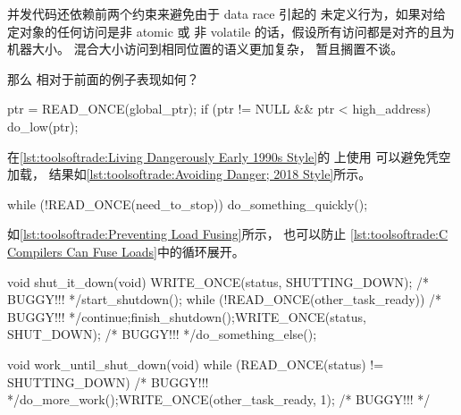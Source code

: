 并发代码还依赖前两个约束来避免由于 data race 引起的
未定义行为，如果对给定对象的任何访问是非 atomic 或
非 volatile 的话，假设所有访问都是对齐的且为机器大小。
混合大小访问到相同位置的语义更加复杂，
暂且搁置不谈。

那么  相对于前面的例子表现如何？

\begin{listing}
\begin{fcvlabel}
\begin{VerbatimL}[commandchars=\\\{\}]
ptr = READ_ONCE(global_ptr);
if (ptr != NULL && ptr < high_address)
	do_low(ptr);
\end{VerbatimL}
\end{fcvlabel}
\caption{避免危险，2018 风格}
\label{lst:toolsoftrade:Avoiding Danger; 2018 Style}
\end{listing}

在\cref{lst:toolsoftrade:Living Dangerously Early 1990s Style}的
上使用  可以避免凭空加载，
结果如\cref{lst:toolsoftrade:Avoiding Danger; 2018 Style}所示。

\begin{listing}
\begin{fcvlabel}
\begin{VerbatimL}[commandchars=\\\{\}]
while (!READ_ONCE(need_to_stop))
	do_something_quickly();
\end{VerbatimL}
\end{fcvlabel}
\caption{防止加载融合}
\label{lst:toolsoftrade:Preventing Load Fusing}
\end{listing}

如\cref{lst:toolsoftrade:Preventing Load Fusing}所示，
 也可以防止
\cref{lst:toolsoftrade:C Compilers Can Fuse Loads}中的循环展开。

\begin{listing}
\begin{fcvlabel}
\begin{VerbatimL}[commandchars=\\\[\]]
void shut_it_down(void)
{
	WRITE_ONCE(status, SHUTTING_DOWN); /* BUGGY!!! */\lnlbl[store:a]
	start_shutdown();
	while (!READ_ONCE(other_task_ready)) /* BUGGY!!! */\lnlbl[loop:b]
		continue;\lnlbl[loop:e]
	finish_shutdown();\lnlbl[finish]
	WRITE_ONCE(status, SHUT_DOWN); /* BUGGY!!! */\lnlbl[store:b]
	do_something_else();
}

void work_until_shut_down(void)
{
	while (READ_ONCE(status) != SHUTTING_DOWN) /* BUGGY!!! */
		do_more_work();
	WRITE_ONCE(other_task_ready, 1); /* BUGGY!!! */
}
\end{VerbatimL}
\end{fcvlabel}
\caption{防止存储融合和凭空存储}
\label{lst:toolsoftrade:Preventing Store Fusing and Invented Stores}
\end{listing}

